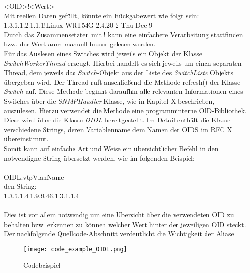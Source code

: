 <OID>!<Wert>\\

Mit reellen Daten gefüllt, könnte ein Rückgabewert wie folgt sein:\\

1.3.6.1.2.1.1.1!Linux WRT54G 2.4.20 2 Thu Dec 9\\


Durch das Zusammensetzten mit ! kann eine einfachere Verarbeitung stattfinden bzw. der Wert auch manuell besser gelesen werden.\\
Für das Auslesen eines Switches wird jeweils ein Objekt der Klasse \textit{SwitchWorkerThread} erzeugt. Hierbei handelt es sich jeweils um einen separaten Thread, dem jeweils das \textit{Switch}-Objekt aus der Liste des \textit{SwitchListe} Objekts übergeben wird.
Der Thread ruft anschließend die Methode refresh() der Klasse \textit{Switch} auf.
Diese Methode beginnt daraufhin alle relevanten Informationen eines Switches über die \textit{SNMPHandler} Klasse, wie in Kapitel X beschrieben, auszulesen.
Hierzu verwendet die Methode eine programminterne OID-Bibliothek. Diese wird über die Klasse \textit{OIDL} bereitgestellt. Im Detail enthält die Klasse verschiedene Strings, deren Variablenname dem Namen der OIDS im RFC X übereinstimmt.\\
Somit kann auf einfache Art und Weise ein übersichtlicher Befehl in den notwendigne String übersetzt werden, wie im folgenden Beispiel:\\
\\
OIDL.vtpVlanName\\
den String:\\
1.3.6.1.4.1.9.9.46.1.3.1.1.4\\
\\
Dies ist vor allem notwendig um eine Übersicht über die verwendeten OID zu behalten bzw. erkennen zu können welcher Wert hinter der jeweiligen OID steckt. Der nachfolgende Quellcode-Abschnitt verdeutlicht die Wichtigkeit der Aliase:\\

\begin{figure}[H]
\centering
\texttt{[image: code\_example\_OIDL.png]}
\caption{Codebeispiel}
\label{fig:classdiagramcode}
\end{figure}

